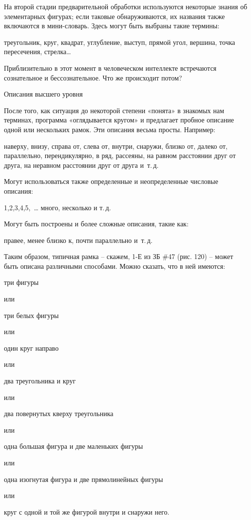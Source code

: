 \documentclass[../main.tex]{subfiles}
\begin{document}
На второй стадии предварительной обработки используются некоторые знания об элементарных фигурах; если таковые обнаруживаются, их названия также включаются в мини-словарь. Здесь могут быть выбраны такие термины:

треугольник, круг, квадрат, углубление, выступ, прямой угол, вершина, точка пересечения, стрелка\ldots{}

Приблизительно в этот момент в человеческом интеллекте встречаются сознательное и бессознательное. Что же происходит потом?

Описания высшего уровня

После того, как ситуация до некоторой степени «понята» в знакомых нам терминах, программа «оглядывается кругом» и предлагает пробное описание одной или нескольких рамок. Эти описания весьма просты. Например:

наверху, внизу, справа от, слева от, внутри, снаружи, близко от, далеко от, параллельно, перендикулярно, в ряд, рассеяны, на равном расстоянии друг от друга, на неравном расстоянии друг от друга и~т.\,д.

Могут использоваться также определенные и неопределенные числовые описания:

1,2,3,4,5,~\ldots{} много, несколько и т.\,д.

Могут быть построены и более сложные описания, такие как:

правее, менее близко к, почти параллельно и~т.\,д.

Таким образом, типичная рамка \--- скажем, 1-Е из ЗБ \#47 (рис. 120) \--- может быть описана различными способами. Можно сказать, что в ней имеются:

три фигуры

или

три белых фигуры

или

один круг направо

или

два треугольника и круг

или

два повернутых кверху треугольника

или

одна большая фигура и две маленьких фигуры

или

одна изогнутая фигура и две прямолинейных фигуры

или

круг с одной и той же фигурой внутри и снаружи него.
\end{document}

